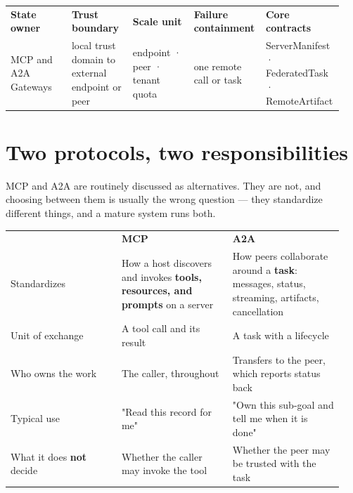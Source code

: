\BookTableStart
\fontsize{7.2}{9}\selectfont
\begin{tabular}{@{}Y{0.1880\linewidth}Y{0.1880\linewidth}Y{0.1880\linewidth}Y{0.1880\linewidth}Y{0.1880\linewidth}@{}}
\color{white}\bfseries \textbf{State owner} & \color{white}\bfseries \textbf{Trust boundary} & \color{white}\bfseries \textbf{Scale unit} & \color{white}\bfseries \textbf{Failure containment} & \color{white}\bfseries \textbf{Core contracts} \\
MCP and A2A Gateways & local trust domain to external endpoint or peer & endpoint · peer · tenant quota & one remote call or task & ServerManifest · FederatedTask · RemoteArtifact \\
\end{tabular}
\BookTableEnd

\section{Two protocols, two responsibilities}

MCP and A2A are routinely discussed as alternatives. They are not, and choosing between them is usually the wrong question — they standardize different things, and a mature system runs both.\par

\BookTableStart
\small
\begin{tabular}{@{}Y{0.3133\linewidth}Y{0.3133\linewidth}Y{0.3133\linewidth}@{}}
\color{white}\bfseries  & \color{white}\bfseries \textbf{MCP} & \color{white}\bfseries \textbf{A2A} \\
Standardizes & How a host discovers and invokes \textbf{tools, resources, and prompts} on a server & How peers collaborate around a \textbf{task}: messages, status, streaming, artifacts, cancellation \\
Unit of exchange & A tool call and its result & A task with a lifecycle \\
Who owns the work & The caller, throughout & Transfers to the peer, which reports status back \\
Typical use & "Read this record for me" & "Own this sub-goal and tell me when it is done" \\
What it does \textbf{not} decide & Whether the caller may invoke the tool & Whether the peer may be trusted with the task \\
\end{tabular}
\BookTableEnd

